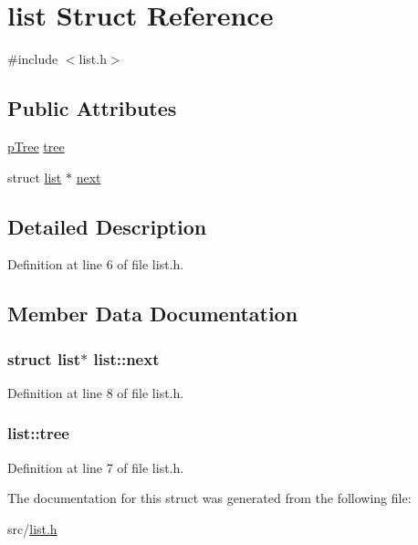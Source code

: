 \hypertarget{structlist}{\section{list Struct Reference}
\label{structlist}
}


{\ttfamily \#include $<$list.\-h$>$}

\subsection*{Public Attributes}
\begin{DoxyCompactItemize}
\item 
\hyperlink{tree_8h_a1a9c0dbc983f5544b79f364749dc2cf8}{p\-Tree} \hyperlink{structlist_a8b7cb8fdcb11abf667b985ce198981a6}{tree}
\item 
struct \hyperlink{structlist}{list} $\ast$ \hyperlink{structlist_a1900fe79e875e2838625b2eb60837f8f}{next}
\end{DoxyCompactItemize}


\subsection{Detailed Description}


Definition at line 6 of file list.\-h.



\subsection{Member Data Documentation}
\hypertarget{structlist_a1900fe79e875e2838625b2eb60837f8f}{
\subsubsection[{next}]{\setlength{\rightskip}{0pt plus 5cm}struct {\bf list}$\ast$ list\-::next}}\label{structlist_a1900fe79e875e2838625b2eb60837f8f}


Definition at line 8 of file list.\-h.

\hypertarget{structlist_a8b7cb8fdcb11abf667b985ce198981a6}{
\subsubsection[{tree}]{ list\-::tree}}\label{structlist_a8b7cb8fdcb11abf667b985ce198981a6}


Definition at line 7 of file list.\-h.



The documentation for this struct was generated from the following file\-:\begin{DoxyCompactItemize}
\item 
src/\hyperlink{list_8h}{list.\-h}\end{DoxyCompactItemize}
